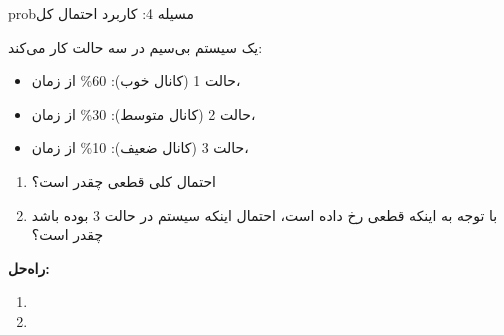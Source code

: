 \begin{PSbox}[unbreakable]{prob}{مسیله 4: کاربرد احتمال کل}

یک سیستم بی‌سیم در سه حالت کار می‌کند:

\begin{itemize}
\tightlist
\item
  حالت 1 (کانال خوب): 60\% از زمان، 
\item
  حالت 2 (کانال متوسط): 30\% از زمان، 
\item
  حالت 3 (کانال ضعیف): 10\% از زمان، 
\end{itemize}

\begin{enumerate}
\def\labelenumi{(\alph{enumi})}
\tightlist
\item
  احتمال کلی قطعی چقدر است؟
\item
  با توجه به اینکه قطعی رخ داده است، احتمال اینکه سیستم در حالت 3 بوده باشد چقدر است؟
\end{enumerate}

\textbf{راه‌حل:}

\begin{enumerate}
\def\labelenumi{(\alph{enumi})}
\item
\item
\end{enumerate}

\end{PSbox}

